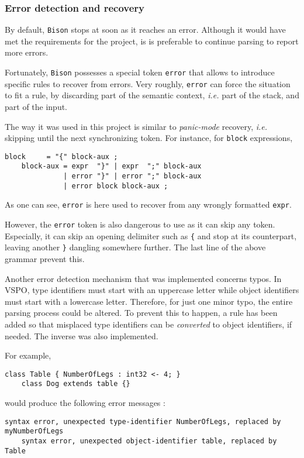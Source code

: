 \documentclass[a4paper, 12pt]{article}
\begin{document}
	\subsubsection{Error detection and recovery}
	
	By default, \texttt{Bison} stops at soon as it reaches an error. Although it would have met the requirements for the project, is is preferable to continue parsing to report more errors.
	
	Fortunately, \texttt{Bison} possesses a special token \texttt{error} that allows to introduce specific rules to recover from errors. Very roughly, \texttt{error} can force the situation to fit a rule, by discarding part of the semantic context, \emph{i.e.} part of the stack, and part of the input.
	
	The way it was used in this project is similar to \emph{panic-mode} recovery, \emph{i.e.} skipping until the next synchronizing token. For instance, for \texttt{block} expressions,
	\vspace{0.5em}
	
	\begin{lstlisting}[style=vsop]
    block     = "{" block-aux ;
    block-aux = expr  "}" | expr  ";" block-aux
              | error "}" | error ";" block-aux
              | error block block-aux ;
	\end{lstlisting}
	
	As one can see, \texttt{error} is here used to recover from any wrongly formatted \lstinline[style=vsop]{expr}.
	
	However, the \texttt{error} token is also dangerous to use as it can skip any token. Especially, it can skip an opening delimiter such as \texttt{\{} and stop at its counterpart, leaving another \texttt{\}} dangling somewhere further. The last line of the above grammar prevent this.
	
    Another error detection mechanism that was implemented concerns typos. In VSPO, type identifiers must start with an uppercase letter while object identifiers must start with a lowercase letter. Therefore, for just one minor typo, the entire parsing process could be altered. To prevent this to happen, a rule has been added so that misplaced type identifiers can be \emph{converted} to object identifiers, if needed. The inverse was also implemented.
    
    For example,
    \begin{lstlisting}[style=vsop]
    class Table { NumberOfLegs : int32 <- 4; }
    class Dog extends table {}
	\end{lstlisting}
	would produce the following error messages :
	\begin{lstlisting}[style=vsop]
    syntax error, unexpected type-identifier NumberOfLegs, replaced by myNumberOfLegs
    syntax error, unexpected object-identifier table, replaced by Table
	\end{lstlisting}
	
\end{document}
